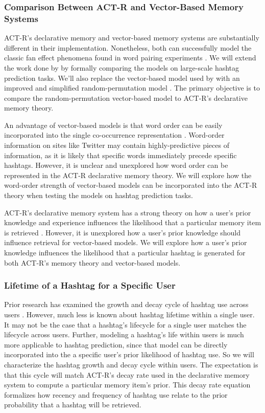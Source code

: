 \documentclass[man,floatsintext]{apa6}
\begin{document}
\subsubsection{Comparison Between ACT-R and Vector-Based Memory Systems}

ACT-R's declarative memory and vector-based memory systems are substantially different in their implementation.
Nonetheless, both can successfully model the classic fan effect phenomena found in word pairing experiments \parencite{Rutledge2008}.
We will extend the work done by \textcite{Rutledge2008} by formally comparing the models on large-scale hashtag prediction tasks.
We'll also replace the vector-based model used by \textcite{Rutledge2008} with an improved and simplified random-permutation model \parencite{Sahlgren2008}.
The primary objective is to compare the random-permutation vector-based model to ACT-R's declarative memory theory.

An advantage of vector-based models is that word order can be easily incorporated into the single co-occurrence representation \parencite{Jones2007}.
Word-order information on sites like Twitter may contain highly-predictive pieces of information, as it is likely that specific words immediately precede specific hashtags.
However, it is unclear and unexplored how word order can be represented in the ACT-R declarative memory theory.
We will explore how the word-order strength of vector-based models can be incorporated into the ACT-R theory when testing the models on hashtag prediction tasks.

ACT-R's declarative memory system has a strong theory on how a user's prior knowledge and experience influences the likelihood that a particular memory item is retrieved \parencite{Anderson2004}.
However, it is unexplored how a user's prior knowledge should influence retrieval for vector-based models.
We will explore how a user's prior knowledge influences the likelihood that a particular hashtag is generated for both ACT-R's memory theory and vector-based models.

\subsubsection{Lifetime of a Hashtag for a Specific User}

Prior research has examined the growth and decay cycle of hashtag use across users \parencite{Tsur2012}.
However, much less is known about hashtag lifetime within a single user.
It may not be the case that a hashtag's lifecycle for a single user matches the lifecycle across users.
Further, modeling a hashtag's life within users is much more applicable to hashtag prediction, since that model can be directly incorporated into the a specific user's prior likelihood of hashtag use.
So we will characterize the hashtag growth and decay cycle within users.
The expectation is that this cycle will match ACT-R's decay rate used in the declarative memory system to compute a particular memory item's prior.
This decay rate equation formalizes how recency and frequency of hashtag use relate to the prior probability that a hashtag will be retrieved.
\end{document}
